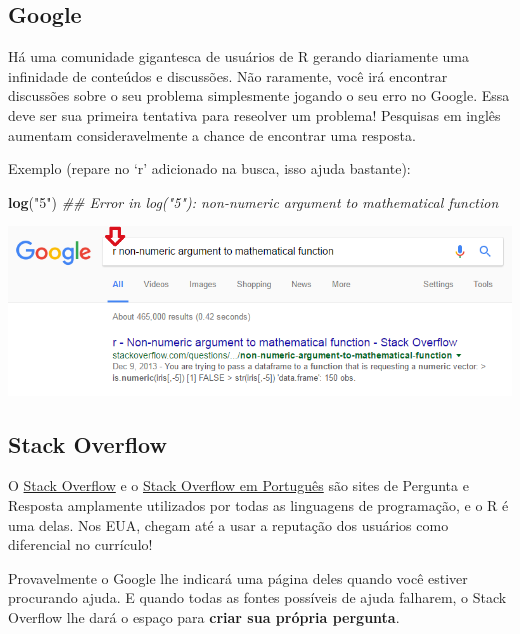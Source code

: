 \documentclass[
]{book}
\newenvironment{Shaded}{\begin{snugshade}}{\end{snugshade}}
\newcommand{\CommentTok}[1]{\textcolor[rgb]{0.56,0.35,0.01}{\textit{#1}}}
\newcommand{\KeywordTok}[1]{\textcolor[rgb]{0.13,0.29,0.53}{\textbf{#1}}}
\newcommand{\NormalTok}[1]{#1}
\newcommand{\StringTok}[1]{\textcolor[rgb]{0.31,0.60,0.02}{#1}}
\begin{document}
\hypertarget{google}{%
\subsection{Google}\label{google}}

Há uma comunidade gigantesca de usuários de R gerando diariamente uma infinidade de conteúdos e discussões. Não raramente, você irá encontrar discussões sobre o seu problema simplesmente jogando o seu erro no Google. Essa deve ser sua primeira tentativa para reseolver um problema! Pesquisas em inglês aumentam consideravelmente a chance de encontrar uma resposta.

Exemplo (repare no `r' adicionado na busca, isso ajuda bastante):

\begin{Shaded}
\begin{Highlighting}[]
\KeywordTok{log}\NormalTok{(}\StringTok{"5"}\NormalTok{)}
\CommentTok{## Error in log("5"): non-numeric argument to mathematical function}
\end{Highlighting}
\end{Shaded}

\begin{center}\includegraphics[width=11.04in]{img/r-base/ajuda_google} \end{center}

\hypertarget{stack-overflow}{%
\subsection{Stack Overflow}\label{stack-overflow}}

O \href{http://stackoverflow.com/}{Stack Overflow} e o \href{http://pt.stackoverflow.com/}{Stack Overflow em Português} são sites de Pergunta e Resposta amplamente utilizados por todas as linguagens de programação, e o R é uma delas. Nos EUA, chegam até a usar a reputação dos usuários como diferencial no currículo!

Provavelmente o Google lhe indicará uma página deles quando você estiver procurando ajuda. E quando todas as fontes possíveis de ajuda falharem, o Stack Overflow lhe dará o espaço para \textbf{criar sua própria pergunta}.
\end{document}
